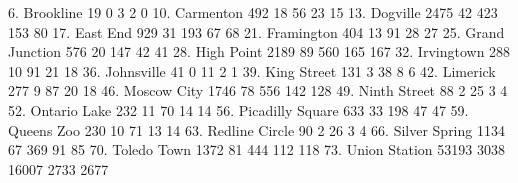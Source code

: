         6. Brookline {\VBAR}         19           0           3           2           0
       10. Carmenton {\VBAR}        492          18          56          23          15
        13. Dogville {\VBAR}       2475          42         423         153          80
        17. East End {\VBAR}        929          31         193          67          68
      21. Framington {\VBAR}        404          13          91          28          27
  25. Grand Junction {\VBAR}        576          20         147          42          41
      28. High Point {\VBAR}       2189          89         560         165         167
      32. Irvingtown {\VBAR}        288          10          91          21          18
      36. Johnsville {\VBAR}         41           0          11           2           1
     39. King Street {\VBAR}        131           3          38           8           6
        42. Limerick {\VBAR}        277           9          87          20          18
     46. Moscow City {\VBAR}       1746          78         556         142         128
    49. Ninth Street {\VBAR}         88           2          25           3           4
    52. Ontario Lake {\VBAR}        232          11          70          14          14
56. Picadilly Square {\VBAR}        633          33         198          47          47
      59. Queens Zoo {\VBAR}        230          10          71          13          14
  63. Redline Circle {\VBAR}         90           2          26           3           4
   66. Silver Spring {\VBAR}       1134          67         369          91          85
     70. Toledo Town {\VBAR}       1372          81         444         112         118
   73. Union Station {\VBAR}      53193        3038       16007        2733        2677

